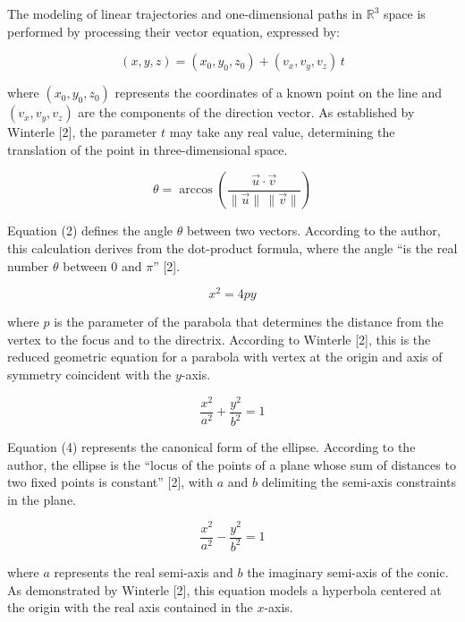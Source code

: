 \documentclass[conference,a4paper]{IEEEtran}
\begin{document}
The modeling of linear trajectories and one-dimensional paths in $\mathbb{R}^3$ space is performed by processing their vector equation, expressed by:

\begin{equation}
(x,y,z) = (x_0,y_0,z_0) + (v_x,v_y,v_z)\,t \tag{1}
\end{equation}

where $(x_0, y_0, z_0)$ represents the coordinates of a known point on the line and $(v_x, v_y, v_z)$ are the components of the direction vector. As established by Winterle [2], the parameter $t$ may take any real value, determining the translation of the point in three-dimensional space.

\begin{equation}
\theta = \arccos\!\left(\frac{\vec{u}\cdot\vec{v}}{\lVert \vec{u}\rVert\,\lVert \vec{v}\rVert}\right) \tag{2}
\end{equation}

Equation (2) defines the angle $\theta$ between two vectors. According to the author, this calculation derives from the dot-product formula, where the angle ``is the real number $\theta$ between $0$ and $\pi$'' [2].

\begin{equation}
x^2 = 4py \tag{3}
\end{equation}

where $p$ is the parameter of the parabola that determines the distance from the vertex to the focus and to the directrix. According to Winterle [2], this is the reduced geometric equation for a parabola with vertex at the origin and axis of symmetry coincident with the $y$-axis.

\begin{equation}
\frac{x^2}{a^2}+\frac{y^2}{b^2} = 1 \tag{4}
\end{equation}

Equation (4) represents the canonical form of the ellipse. According to the author, the ellipse is the ``locus of the points of a plane whose sum of distances to two fixed points is constant'' [2], with $a$ and $b$ delimiting the semi-axis constraints in the plane.

\begin{equation}
\frac{x^2}{a^2}-\frac{y^2}{b^2} = 1 \tag{5}
\end{equation}

where $a$ represents the real semi-axis and $b$ the imaginary semi-axis of the conic. As demonstrated by Winterle [2], this equation models a hyperbola centered at the origin with the real axis contained in the $x$-axis.
\end{document}
